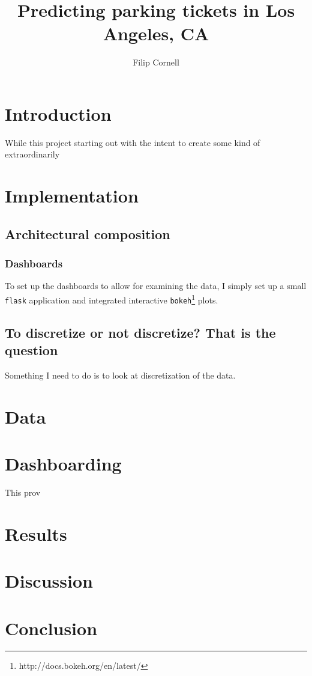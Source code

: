 \documentclass{article}
\begin{document}
\title{Predicting parking tickets in Los Angeles, CA}
\author{Filip Cornell}
\maketitle


\section{Introduction}

While this project starting out with the intent to create some kind of extraordinarily 

\section{Implementation}

\subsection{Architectural composition}

\subsubsection{Dashboards}

To set up the dashboards to allow for examining the data, I simply set up a small \verb|flask| application and integrated interactive \verb|bokeh|\footnote{http://docs.bokeh.org/en/latest/} plots. 

\subsection{To discretize or not discretize? That is the question}

Something I need to do is to look at discretization of the data. %

\section{}

\section{Data}

\section{Dashboarding}

This prov

\section{Results}

\section{Discussion}

\section{Conclusion}
\end{document}
